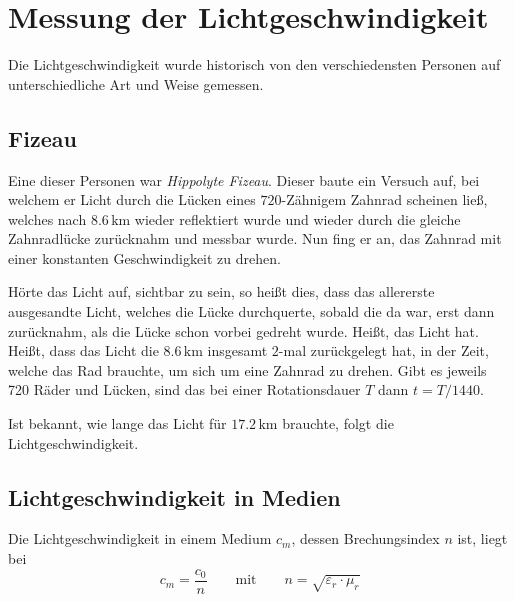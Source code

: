 \documentclass{article}
\begin{document}
\section{Messung der Lichtgeschwindigkeit}
Die Lichtgeschwindigkeit wurde historisch von den verschiedensten Personen auf unterschiedliche Art und Weise gemessen.
 
\subsection{Fizeau} 
Eine dieser Personen war \emph{Hippolyte Fizeau}. Dieser baute ein Versuch auf, bei welchem er Licht durch die Lücken eines $720$-Zähnigem Zahnrad scheinen ließ, welches nach $8.6\,\text{km}$ wieder reflektiert wurde und wieder durch die gleiche Zahnradlücke zurücknahm und messbar wurde. Nun fing er an, das Zahnrad mit einer konstanten Geschwindigkeit zu drehen.
 
Hörte das Licht auf, sichtbar zu sein, so heißt dies, dass das allererste ausgesandte Licht, welches die Lücke durchquerte, sobald die da war, erst dann zurücknahm, als die Lücke schon vorbei gedreht wurde. Heißt, das Licht hat. Heißt, dass das Licht die $8.6\,\text{km}$ insgesamt $2$-mal zurückgelegt hat, in der Zeit, welche das Rad brauchte, um sich um eine Zahnrad zu drehen. Gibt es jeweils 720 Räder und Lücken, sind das bei einer Rotationsdauer $T$ dann $t=T/1440$.
 
Ist bekannt, wie lange das Licht für $17.2\,\text{km}$ brauchte, folgt die Lichtgeschwindigkeit. 
 
\subsection{Lichtgeschwindigkeit in Medien}
Die Lichtgeschwindigkeit in einem Medium $c_m$, dessen Brechungsindex $n$ ist, liegt bei
\[
 c_m = \frac{c_0}{n}
 \qquad \text{mit} \qquad
 n = \sqrt{\varepsilon_r \cdot \mu_r}  
\]
\end{document}
